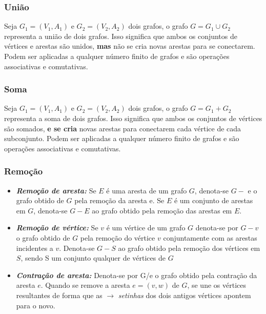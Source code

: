 \documentclass[12pt]{article}
\begin{document}
\subsubsection{União}
Seja $G_1=(V_1, A_1)$ e $G_2 = (V_2, A_2)$ dois grafos, o grafo $G = G_1 \cup G_2$ representa a união de dois grafos.
Isso significa que ambos os conjuntos de vértices e arestas são unidos, \textbf{mas} não se cria novas arestas para se conectarem.
Podem ser aplicadas a qualquer número finito de grafos e são operações associativas e comutativas.

\subsubsection{Soma}
Seja $G_1=(V_1, A_1)$ e $G_2 = (V_2, A_2)$ dois grafos, o grafo $G = G_1 + G_2$ representa a soma de dois grafos.
Isso significa que ambos os conjuntos de vértices são somados, \textbf{e se cria} novas arestas para conectarem cada vértice de cada subconjunto.
Podem ser aplicadas a qualquer número finito de grafos e são operações associativas e comutativas.

\subsubsection{Remoção}

\begin{itemize}
	\item \textbf{\textit{Remoção de aresta:}}
	      Se $E$ é uma aresta de um grafo $G$, denota-se $G-$ e o grafo obtido de $G$ pela remoção da aresta e.
	      Se $E$ é um conjunto de arestas em $G$, denota-se $G-E$ ao grafo obtido pela remoção das arestas em $E$.
	\item \textbf{\textit{Remoção de vértice:}}
	      Se $v$ é um vértice de um grafo $G$ denota-se por $G - v$ o grafo obtido de $G$ pela remoção do vértice $v$ conjuntamente com as arestas incidentes a $v$.
	      Denota-se $G - S$ ao grafo obtido pela remoção dos vértices em $S$,
	      sendo S um conjunto qualquer de vértices de $G$
	\item \textbf{\textit{Contração de aresta:}} Denota-se por G/e o grafo obtido pela contração da aresta $e$.
	Quando se remove a aresta $e = (v, w)$ de $G$, se une os vértices resultantes de forma que as $\longrightarrow$ \textit{setinhas} dos dois antigos vértices apontem para o novo.
\end{itemize}
\end{document}
